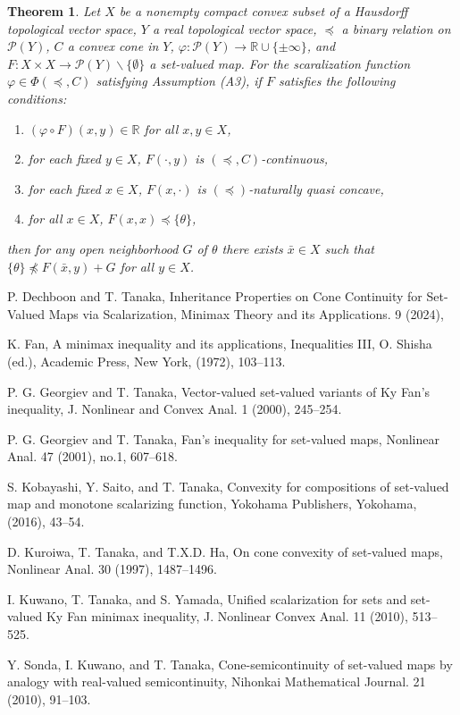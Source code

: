 \documentclass[a4paper,11pt]{jsarticle}
\newtheorem{thm}{Theorem}[section]
\theoremstyle{definition}
\newcommand{\RealNumberSet}{\mathbb{R}}
\begin{document}
\begin{thm}
  Let $X$ be a nonempty compact convex subset of a Hausdorff topological vector space,
  $Y$ a real topological vector space, $\preccurlyeq$ a binary relation on $\mathcal{P}(Y)$,
  $C$ a convex cone in $Y$, $\varphi\colon \mathcal{P}(Y) \to \RealNumberSet \cup \{\pm \infty\}$,
  and $F\colon X \times X \to \mathcal{P}(Y) \backslash \{\emptyset\}$ a set-valued map.
  For the scaralization function $\varphi \in \Phi(\preccurlyeq, C)$ satisfying Assumption (A3),
  if $F$ satisfies the following conditions:
  \begin{enumerate}
    \item $(\varphi \circ F)(x,y) \in \RealNumberSet$ for all $x,y \in X$,
    \item for each fixed $y \in X$, $F(\cdot,y)$ is $(\preccurlyeq, C)$-continuous,
    \item for each fixed $x \in X$, $F(x,\cdot)$ is $(\preccurlyeq)$-naturally quasi concave,
    \item for all $x \in X$, $F(x,x) \preccurlyeq \{\theta\}$,
  \end{enumerate}
  then for any open neighborhood $G$ of $\theta$ there exists $\bar{x} \in X$ such that
  $\{\theta\} \npreccurlyeq F(\bar{x},y) + G$ for all $y \in X$.
\end{thm}

\begin{thebibliography}{99}
  P. Dechboon and T. Tanaka, Inheritance Properties on Cone Continuity for Set-Valued Maps via Scalarization, Minimax Theory and its Applications. 9 (2024),

  K. Fan, A minimax inequality and its applications, Inequalities III, O. Shisha (ed.), Academic Press, New York, (1972), 103--113.

  P. G. Georgiev and T. Tanaka, Vector-valued set-valued variants of Ky Fan's inequality, J. Nonlinear and Convex Anal. 1 (2000), 245--254.

  P. G. Georgiev and T. Tanaka, Fan's inequality for set-valued maps, Nonlinear Anal. 47 (2001), no.1, 607--618.

  S. Kobayashi, Y. Saito, and T. Tanaka, Convexity for compositions of set-valued map and monotone scalarizing function, Yokohama Publishers, Yokohama, (2016), 43--54.

  D. Kuroiwa, T. Tanaka, and T.X.D. Ha, On cone convexity of set-valued maps, Nonlinear Anal. 30 (1997), 1487--1496.

  I. Kuwano, T. Tanaka, and S. Yamada, Unified scalarization for sets and set-valued Ky Fan minimax inequality, J. Nonlinear Convex Anal. 11 (2010), 513--525.

  Y. Sonda, I. Kuwano, and T. Tanaka, Cone-semicontinuity of set-valued maps by analogy with real-valued semicontinuity, Nihonkai Mathematical Journal. 21 (2010), 91--103.

\end{thebibliography}
\end{document}
